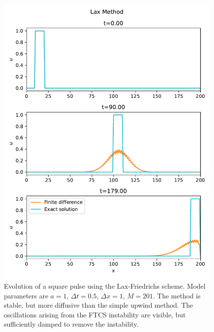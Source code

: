 \documentclass[%
 reprint,
 amsmath,amssymb,
 aps,
]{revtex4-2}
\begin{document}
\begin{figure}
\includegraphics[width=0.9\linewidth]{proj2-1/snapshots-lax.pdf}
\caption{\label{fig:snapshots-lax}Evolution of a square pulse using the Lax-Friedrichs scheme. Model parameters are $a=1$, $\Delta t=0.5$, $\Delta x=1$, $M=201$. The method is stable, but more diffusive than the simple upwind method. The oscillations arising from the FTCS instability are visible, but sufficiently damped to remove the instability.}
\end{figure}
\end{document}
